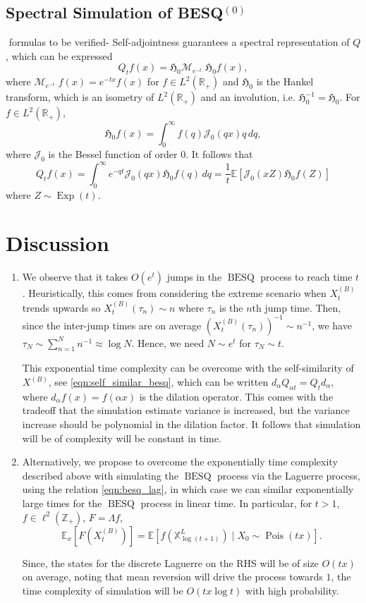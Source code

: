 \documentclass[11pt,a4,reqno]{amsart}
\numberwithin{equation}{section}
\theoremstyle{definition}
\theoremstyle{remark}
\newcommand{\bb}[1]{\mathbb{#1}}
\newcommand{\cl}[1]{\mathcal{#1}}
\newcommand{\frk}[1]{\mathfrak{#1}}
\newcommand{\E}{\bb{E}}
\newcommand{\R}{\bb{R}}
\newcommand{\Z}{\bb{Z}}
\DeclareMathOperator{\besq}{BESQ}
\DeclareMathOperator{\pois}{Pois}
\DeclareMathOperator{\Exp}{Exp}
\newcommand{\beq}{\begin{equation}}
\newcommand{\eeq}{\end{equation}}
\begin{document}
\subsection{Spectral Simulation of BESQ${}^{(0)}$}
	${}$ {\color{red} formulas to be verified-} Self-adjointness guarantees a spectral representation of $Q$, which can be expressed 
		\beq Q_t f(x) = \frk{H}_0 \cl{M}_{e^{-t\cdot}} \frk{H}_0 f(x), \eeq
		where $\cl{M}_{e^{-t\cdot}}f(x) = e^{-tx} f(x)$ for $f \in L^2(\R_+)$ and $\frk{H}_0$ is the Hankel transform, which is an isometry of $L^2(\R_+)$ and an involution, i.e. $\frk{H}_0^{-1} = \frk{H}_0$. For $f \in L^2(\R_+)$, 
		\beq \frk{H}_0 f(x) = \int_0^\infty f(q) \cl{J}_0(qx) q \, dq , \eeq
		where $\cl{J}_0$ is the Bessel function of order $0$. It follows that 
		\beq Q_tf(x) = \int_0^\infty e^{-qt} \cl{J}_0(qx) \frk{H}_0f(q) \, dq = \frac{1}{t} \E[\cl{J}_0(xZ) \frk{H}_0f(Z)] \eeq
		where $Z \sim \Exp(t)$. 
	


	
\section{Discussion}

	\begin{enumerate}
		\item We observe that it takes $O(e^t)$ jumps in the $\besq$ process to reach time $t$. Heuristically, this comes from considering the extreme scenario when $X_t^{(B)}$ trends upwards so $X_t^{(B)}(\tau_n) \sim n$ where $\tau_n$ is the $n$th jump time. Then, since the inter-jump times are on average $(X_t^{(B)}(\tau_n))^{-1} \sim n^{-1}$, we have $\tau_N \sim \sum_{n = 1}^N n^{-1} \approx \log N$. Hence, we need $N \sim e^t$ for $\tau_N \sim t$. 
		
		This exponential time complexity can be overcome with the self-similarity of $X^{(B)}$, see \eqref{eqn:self_similar_besq}, which can be written $d_{\alpha} Q_{\alpha t} = Q_{t} d_\alpha$, where $d_\alpha f(x) = f(\alpha x)$ is the dilation operator. This comes with the tradeoff that the simulation estimate variance is increased, but the variance increase should be polynomial in the dilation factor. It follows that simulation will be of complexity will be constant in time. 
		
		\item Alternatively, we propose to overcome the exponentially time complexity described above with simulating the $\besq$ process via the Laguerre process, using the relation \eqref{eqn:besq_lag}, in which case we can similar exponentially large times for the $\besq$ process in linear time. In particular, for $t > 1$, $f \in \ell^2(\Z_+)$, $F = \Lambda f$,
			\beq \E_x[F(X_t^{(B)})] = \E[f(\bb{X}^{L}_{\log (t + 1)}) \mid X_0 \sim \pois(tx)] . \eeq
			
			Since, the states for the discrete Laguerre on the RHS will be of size $O(tx)$ on average, noting that mean reversion will drive the process towards $1$, the time complexity of simulation will be $O(tx \log t)$ with high probability. 
		
			
		

	\end{enumerate}
	



\end{document}
